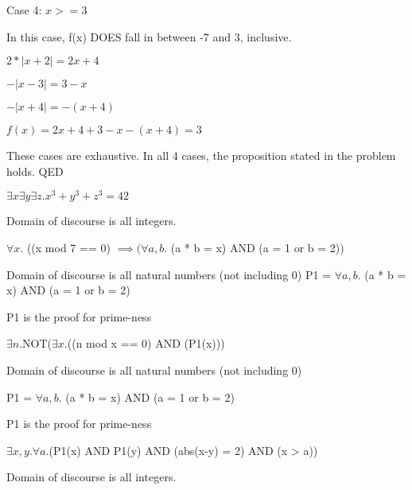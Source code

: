 \documentclass{6042}
\begin{document}
Case 4: $x >= 3$

In this case, f(x) DOES fall in between -7 and 3, inclusive.

$2 * | x + 2 | = 2x + 4$

$- | x - 3 | = 3 - x$

$- | x + 4 | = - (x + 4)$

$f(x) = 2x + 4 + 3 - x - (x + 4) = 3$


These cases are exhaustive. In all 4 cases, the proposition stated in the problem holds. QED







$\exists{x}\exists{y}\exists{z}. x^3 + y^3 + z^3 = 42$

Domain of discourse is all integers.

$\forall{x}$. ((x mod 7 == 0) $\implies (\forall{a, b}$. (a * b = x) AND (a = 1 or b = 2))

Domain of discourse is all natural numbers (not including 0)
P1 = $\forall{a, b}$. (a * b = x) AND (a = 1 or b = 2)

P1 is the proof for prime-ness

$\exists{n}$.NOT($\exists{x}$.((n mod x == 0) AND (P1(x)))

Domain of discourse is all natural numbers (not including 0)

P1 = $\forall{a, b}$. (a * b = x) AND (a = 1 or b = 2)

P1 is the proof for prime-ness

$\exists{x, y}.\forall{a}$.(P1(x) AND P1(y) AND (abs(x-y) = 2) AND (x > a))

Domain of discourse is all integers.
\end{document}
